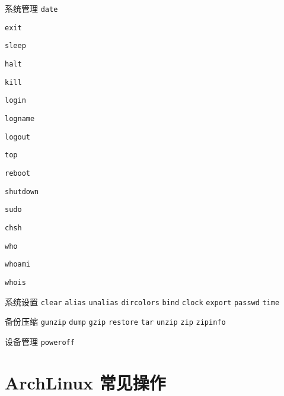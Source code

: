 \documentclass{ctexart}
\begin{document}
\begin{mybox}{系统管理}
    \texttt{date}

    \texttt{exit}

    \texttt{sleep}

    \texttt{halt}
    
    \texttt{kill}

    \texttt{login}

    \texttt{logname}

    \texttt{logout}

    \texttt{top}

    \texttt{reboot}

    \texttt{shutdown}
    
    \texttt{sudo}

    \texttt{chsh}

    \texttt{who}

    \texttt{whoami}

    \texttt{whois}
\end{mybox}

\begin{mybox}{系统设置}
    \texttt{clear}
    \texttt{alias}
    \texttt{unalias}
    \texttt{dircolors}
    \texttt{bind}
    \texttt{clock}
    \texttt{export}
    \texttt{passwd}
    \texttt{time}
\end{mybox}

\begin{mybox}{备份压缩}
    \texttt{gunzip}
    \texttt{dump}
    \texttt{gzip}
    \texttt{restore}
    \texttt{tar}
    \texttt{unzip}
    \texttt{zip}
    \texttt{zipinfo}
\end{mybox}


\begin{mybox}{设备管理}
    \texttt{poweroff}
\end{mybox}

\clearpage
\section{ArchLinux 常见操作}



\end{document}
